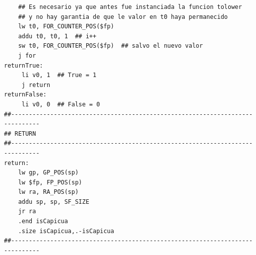 \documentclass[a4paper,10pt]{article}
\begin{document}
\begin{lstlisting}
    ## Es necesario ya que antes fue instanciada la funcion tolower
    ## y no hay garantia de que le valor en t0 haya permanecido
    lw t0, FOR_COUNTER_POS($fp)
    addu t0, t0, 1  ## i++
    sw t0, FOR_COUNTER_POS($fp)  ## salvo el nuevo valor
    j for
returnTrue:
     li v0, 1  ## True = 1
     j return
returnFalse:
     li v0, 0  ## False = 0
##------------------------------------------------------------------------------
## RETURN
##------------------------------------------------------------------------------
return:
    lw gp, GP_POS(sp)
    lw $fp, FP_POS(sp)
    lw ra, RA_POS(sp)
    addu sp, sp, SF_SIZE
    jr ra
    .end isCapicua
    .size isCapicua,.-isCapicua
##------------------------------------------------------------------------------
           
            \end{lstlisting}
            
            
\end{document}
